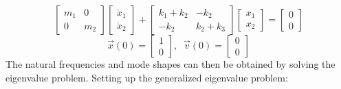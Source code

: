 \documentclass[12pt,letter]{article}
\begin{document}
\begin{example}
	\begin{equation}
		  \begin{bmatrix} m_1 & 0 \\    0  & m_2 \end{bmatrix} \begin{bmatrix} \ddot{x}_1 \\    \ddot{x}_2  \end{bmatrix} + \begin{bmatrix} k_1 + k_2 & -k_2 \\  -k_2  & k_2 + k_3 \end{bmatrix} \begin{bmatrix} x_1 \\    x_2  \end{bmatrix} = \begin{bmatrix} 0 \\  0  \end{bmatrix} 
	\end{equation}
	\begin{equation}
		  \vec{x}(0) = \begin{bmatrix} 1 \\  0 \end{bmatrix},\; \; \vec{v}(0) = \begin{bmatrix} 0 \\  0 \end{bmatrix} \nonumber
	\end{equation}
	The natural frequencies and mode shapes can then be obtained by solving the eigenvalue problem. Setting up the generalized eigenvalue problem: %
	

\end{example}
\end{document}
